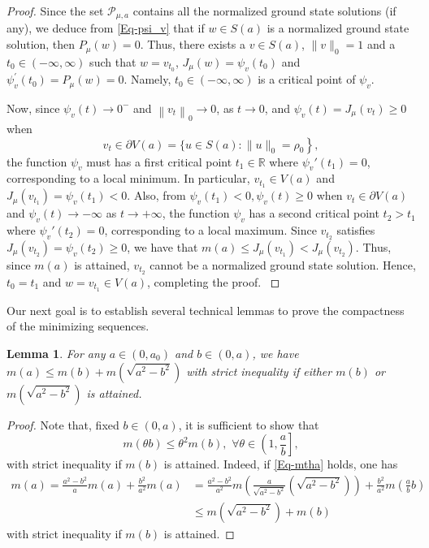 \documentclass[11pt]{amsart}
\newtheorem{lemma}[theorem]{Lemma}
\numberwithin{equation}{section}
\begin{document}
{{\begin{proof}
Since the set $\mathcal{P}_{\mu,a}$ contains all the normalized ground state solutions (if any), we deduce from \eqref{Eq-psi_v} that if $w \in S(a)$ is a normalized ground state solution, then
    $
    {P}_{\mu}\left(w\right)=0.
    $
Thus, there exists a $v \in S(a)$, $\|v\|_{0}=1$ and a $t_0 \in(-\infty, \infty)$ such that $w=v_{t_0}$, $J_\mu(w)=\psi_v\left(t_0\right)$ and $\psi_v^{\prime}\left(t_0\right)={P}_{\mu}\left(w\right)=0$. Namely, $t_0 \in(-\infty, \infty)$ is a critical point of $\psi_v$.

    Now, since $\psi_v(t) \rightarrow 0^{-}$ and $\left\| v_t\right\|_{0} \rightarrow 0$, as $t \rightarrow 0$, and $\psi_v(t)=J_\mu\left(v_t\right) \geq 0$ when
     $$
     v_t \in \partial V(a)=\{u \in\left.S(a):\| u\|_{0}=\rho_0\right\},
     $$
the function $\psi_v$ must has a first critical point $t_1 \in \mathbb{R}$ where $\psi_v'(t_1) = 0$, corresponding to a local minimum.  In particular, $v_{t_1} \in V(a)$ and $J_\mu\left(v_{t_1}\right)=\psi_v\left(t_1\right)<0$. Also, from $\psi_v\left(t_1\right)<0, \psi_v(t) \geq 0$ when $v_t \in \partial V(a)$ and $\psi_v(t) \rightarrow-\infty$ as $t \rightarrow +\infty$, {the function $\psi_v$ has a second critical point $t_2 > t_1$ where $\psi_v'(t_2) = 0$, corresponding to a local maximum.} Since $v_{t_2}$ satisfies $J_\mu\left(v_{t_2}\right)=\psi_v\left(t_2\right) \geq 0$, we have that $m(a) \leq J_\mu\left(v_{t_1}\right)<J_\mu\left(v_{t_2}\right)$. {Thus, since $m(a)$ is attained, $v_{t_2}$ cannot be a normalized ground state solution. Hence, $t_0=t_1$ and $w=v_{t_1} \in V(a)$, completing the proof. }
     \end{proof}
{Our next goal is to establish several technical lemmas to prove the compactness of the minimizing sequences.}
\begin{lemma}\label{Lem4-subadd}
    {For any $a \in\left(0, a_0\right)$ and $b \in(0, a)$,  we have $m(a) \leq m(b)+m(\sqrt{ a^2-b^2})$
with  strict inequality if either $m(b)$ or $m(\sqrt{ a^2-b^2})$ is attained.}
\end{lemma}
\begin{proof}
    {Note that, fixed $b \in(0, a)$, it is sufficient to show that
    \begin{equation}\label{Eq-mtha}
        m(\theta b) \leq \theta^2 m(b),\,\, \forall \theta \in\left(1, \frac{a}{b}\right],
    \end{equation}
    with strict inequality  if $m(b)$ is attained.} Indeed, if \eqref{Eq-mtha} holds, one has
    \begin{equation}
        \begin{aligned}
            m(a) =\frac{a^2-b^2}{a} m(a)+\frac{b^2}{a^2} m(a)&=\frac{a^2-b^2}{a^2} m\left(\frac{a}{\sqrt{a^2-b^2}}(\sqrt{a^2-b^2})\right)+\frac{b^2}{a^2} m\left(\frac{a}{b} b\right) \\
            & \leq m(\sqrt{a^2-b^2})+m(b)
        \end{aligned}
    \end{equation}
    with strict inequality if $m(b)$ is attained.


\end{proof}}}
\end{document}
